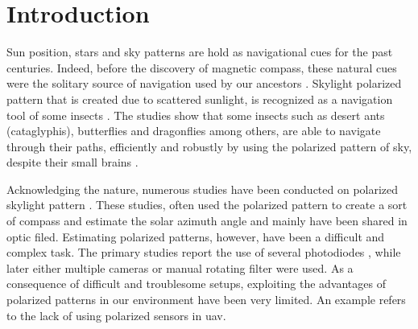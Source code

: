 \graphicspath{{./content/intro/figures/}}

\section{Introduction}
\label{sec:intro}


Sun position, stars and sky patterns are hold as navigational cues for
the past centuries. Indeed, before the discovery of magnetic compass,
these natural cues were the solitary source of navigation used by our
ancestors \cite{barta2005psychophysical, horvath2011trail}.  Skylight
polarized pattern that is created due to scattered sunlight, is
recognized as a navigation tool of some insects
\cite{wehner03antnavigation, labhart202odometer}.  The studies show
that some insects such as desert ants (cataglyphis), butterflies and
dragonflies among others, are able to navigate through their paths,
efficiently and robustly by using the polarized pattern of sky,
despite their small brains \cite{labhart202odometer,
  wehner03antnavigation, hamaoui2017polarized}.

Acknowledging the nature, numerous studies have been conducted on
polarized skylight pattern \cite{lambrinos2000insectnavigation,
  chu2009application, zhao2009novel,
  wang2015novel,chahl2013integration, ashkanazy2015bio,
  sturzl2012fisheye, ma2015skylightpolarization,
  miyazaki09sunlightpolarization, wang2014bionic,
  lu2015angle,hamaoui2017polarized}.  These studies, often used the
polarized pattern to create a sort of compass and estimate the solar
azimuth angle and mainly have been shared in optic filed.  Estimating
polarized patterns, however, have been a difficult and complex task.
The primary studies report the use of several photodiodes
\cite{lambrinos2000insectnavigation, chu2009application,
  zhao2009novel, wang2015novel,chahl2013integration}, while later
either multiple cameras \cite{ashkanazy2015bio, sturzl2012fisheye,
  wang2014bionic} or manual rotating filter
\cite{ma2015skylightpolarization, miyazaki09sunlightpolarization,
  lu2015angle, hamaoui2017polarized} were used.  As a consequence of
difficult and troublesome setups, exploiting the advantages of
polarized patterns in our environment have been very limited. An
example refers to the lack of using polarized sensors in \gls{uav}.

